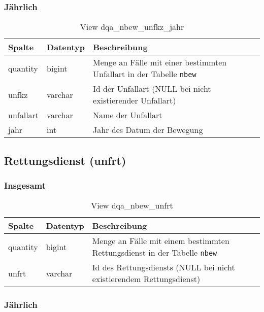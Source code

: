 \subsubsection{Jährlich} \label{subsubsec:bewUnfkzJ}

\begin{table}[ht]
	\centering   
	\caption{View dqa\_nbew\_unfkz\_jahr}
	\label{tab:bewUnfkzJ}
	\begin{tabular}{||l|l|p{10cm}||}
		\hline
		Spalte & Datentyp & Beschreibung \\ [0.5ex]
		\hline\hline
		quantity & bigint & Menge an Fälle mit einer bestimmten Unfallart in der Tabelle \texttt{nbew}\\
		\hline
		unfkz & varchar & Id der Unfallart (NULL bei nicht existierender Unfallart)\\
		\hline
		unfallart & varchar & Name der Unfallart \\
		\hline
		jahr & int &  Jahr des Datum der Bewegung \\
		\hline		
	\end{tabular}
\end{table}

\subsection{Rettungsdienst (unfrt)} \label{subsec:bewUnfrt}

\subsubsection{Insgesamt} \label{subsubsec:bewUnfrtI}

\begin{table}[ht]
	\centering   
	\caption{View dqa\_nbew\_unfrt}
	\label{tab:bewUnfrtI}
	\begin{tabular}{||l|l|p{10cm}||}   		
		\hline
		Spalte & Datentyp & Beschreibung \\ [0.5ex]
		\hline\hline
		quantity & bigint & Menge an Fälle mit einem bestimmten Rettungsdienst in der Tabelle \texttt{nbew} \\
		\hline
		unfrt & varchar & Id des Rettungsdiensts (NULL bei nicht existierendem Rettungsdienst)\\
		\hline
	\end{tabular}
\end{table}

\subsubsection{Jährlich} \label{subsubsec:bewUnfrtJ}

